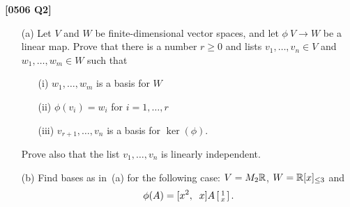 \documentclass[a4paper]{article}
\begin{document}
\begin{problem}\textbf{[0506 Q2]}
 \begin{itemize}
  \item[(a)]
   Let $V$ and $W$ be finite-dimensional vector spaces, and
   let $\phi\:V\to W$ be a linear map.  Prove that there is
   a number $r\geq 0$ and lists $v_1,\dotsc,v_n\in V$ and
   $w_1,\dotsc,w_m\in W$ such that
   \begin{itemize}
    \item[(i)] $w_1,\dotsc,w_m$ is a basis for $W$
    \item[(ii)] $\phi(v_i)=w_i$ for $i=1,\dotsc,r$
    \item[(iii)] $v_{r+1},\dotsc,v_n$ is a basis for
     $\ker(\phi)$. 
   \end{itemize}
   Prove also that the list $v_1,\dotsc,v_n$ is linearly
   independent.  
  \item[(b)]
   Find bases as in~(a) for the following case:
   $V=M_2{\mathbb{R}}$, $W={\mathbb{R}}[x]_{\leq 3}$ and 
   \[ \phi(A) = [x^2,\;\;x] A \left[\begin{smallmatrix} 1\\ x\end{smallmatrix}\right].  \]
 \end{itemize}
\end{problem}
\end{document}
